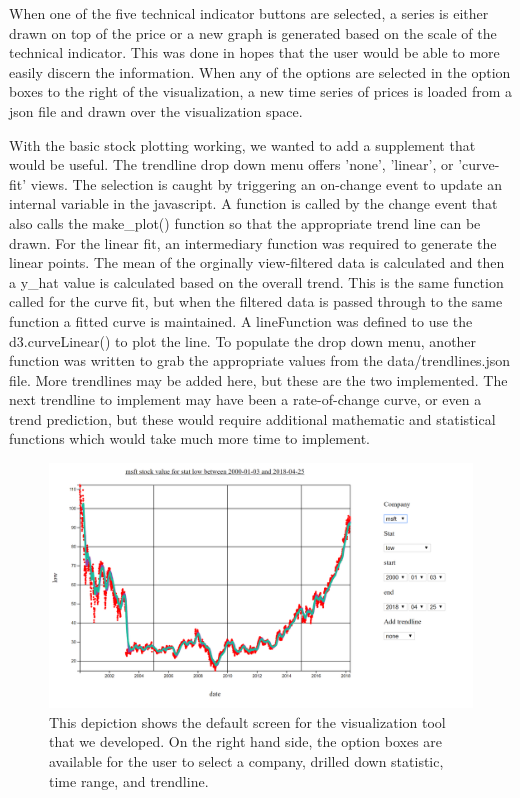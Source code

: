 \documentclass{vgtc}                          %
\begin{document}
When one of the five technical indicator buttons are selected, a series is either drawn on top of the price or a new graph is generated based on the scale of the technical indicator.  This was done in hopes that the user would be able to more easily discern the information.  When any of the options are selected in the option boxes to the right of the visualization, a new time series of prices is loaded from a json file and drawn over the visualization space.

With the basic stock plotting working, we wanted to add a supplement that would be useful. The
trendline drop down menu offers 'none',
'linear', or 'curve-fit' views. The selection is caught by triggering an on-change event to
update an internal variable in the javascript. A function is called by the change event that
also calls the make\_plot() function so that the appropriate trend line can be drawn. For the linear
fit, an intermediary function was required to generate the linear points. The mean of the orginally
view-filtered data is calculated and then a y\_hat value is calculated based on the overall trend. This
is the same function called for the curve fit, but when the filtered data is passed through to the
same function a fitted curve is maintained. A lineFunction was defined to use the d3.curveLinear()
to plot the line. To populate the drop down menu, another function was written to grab the appropriate
values from the data/trendlines.json file. More trendlines may be added here, but these are the two
implemented. The next trendline to implement may have been a rate-of-change curve, or even a trend
prediction, but these would require additional mathematic and statistical functions which would
take much more time to implement.
\begin{figure}[h]
	\centering
	\includegraphics[scale=0.39]{vis2}
	\caption{This depiction shows the default screen for the visualization tool that we developed.  On the right hand side, the option boxes are available for the user to select a company, drilled down statistic, time range, and trendline.}
\end{figure}
\end{document}
